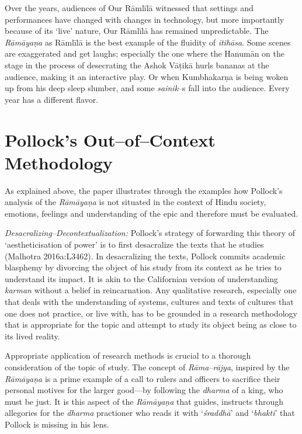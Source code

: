 Over the years, audiences of Our Rāmlīlā witnessed that settings and performances have changed with changes in technology, but more importantly because of its ‘live’ nature, Our Rāmlīlā has remained unpredictable. The \textit{Rāmāyaṇa} as Rāmlīlā is the best example of the fluidity of \textit{itihāsa}. Some scenes are exaggerated and get laughs; especially the one where the Hanumān on the stage in the process of desecrating the Ashok Vāṭikā hurls bananas at the audience, making it an interactive play. Or when Kumbhakarṇa is being woken up from his deep sleep slumber, and some \textit{sainik}–s fall into the audience. Every year has a different flavor.


\section*{Pollock’s Out–of–Context Methodology}

As explained above, the paper illustrates through the examples how Pollock’s analysis of the \textit{Rāmāyaṇa} is not situated in the context of Hindu society, emotions, feelings and understanding of the epic and therefore must be evaluated.

\textit{Desacralizing–Decontextualization:} Pollock’s strategy of forwarding this theory of ‘aestheticisation of power’ is to first desacralize the texts that he studies (Malhotra 2016a:L3462). In desacralizing the texts, Pollock commits academic blasphemy by divorcing the object of his study from its context as he tries to understand its impact. It is akin to the Californian version of understanding \textit{karman} without a belief in reincarnation. Any qualitative research, especially one that deals with the understanding of systems, cultures and texts of cultures that one does not practice, or live with, has to be grounded in a research methodology that is appropriate for the topic and attempt to study its object being as close to its lived reality.

Appropriate application of research methods is crucial to a thorough consideration of the topic of study. The concept of \textit{Rāma–rājya}, inspired by the \textit{Rāmāyaṇa} is a prime example of a call to rulers and officers to sacrifice their personal motives for the larger good—by following the \textit{dharma} of a king, who must be just. It is this aspect of the \textit{Rāmāyaṇa} that guides, instructs through allegories for the \textit{dharma} practioner who reads it with ‘\textit{śraddhā}’ and ‘\textit{bhakti}’ that Pollock is missing in his lens.


